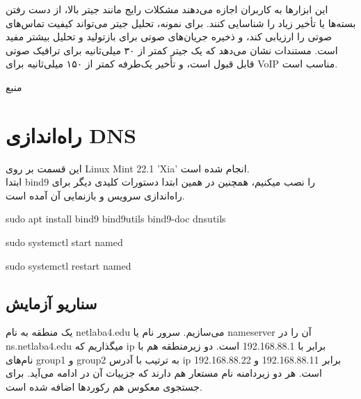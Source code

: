 \documentclass[12pt]{article}
\begin{document}
	 این ابزارها به کاربران اجازه می‌دهند مشکلات رایج مانند جیتر بالا، از دست رفتن بسته‌ها یا تأخیر زیاد را شناسایی کنند. برای نمونه، تحلیل جیتر می‌تواند کیفیت تماس‌های صوتی را ارزیابی کند، و ذخیره جریان‌های صوتی برای بازتولید و تحلیل بیشتر مفید است. مستندات نشان می‌دهد که یک جیتر کمتر از ۳۰ میلی‌ثانیه برای ترافیک صوتی قابل قبول است، و تأخیر یک‌طرفه کمتر از ۱۵۰ میلی‌ثانیه برای VoIP مناسب است.
	 
	 منبع \cite{a3}
	\section{راه‌اندازی \textenglish{DNS}}
	این قسمت بر روی \textenglish{Linux Mint 22.1 'Xia'} انجام شده است.\\
	ابتدا bind9 را نصب میکنیم، همچنین در همین ابتدا دستورات کلیدی دیگر برای راه‌اندازی سرویس و بازنمایی آن آمده است.
	
	\begin{english}
		sudo apt install bind9 bind9utils bind9-doc dnsutils
	\end{english}
	
	\begin{english}
		sudo systemctl start named
	\end{english}
	
	\begin{english}
		sudo systemctl restart named
	\end{english}
	
	\subsection{سناریو آزمایش}
	یک منطقه به نام netlaba4.edu می‌سازیم. سرور نام یا nameserver آن را در ns.netlaba4.edu میگذاریم که ip برابر با 192.168.88.1 است. دو زیرمنطقه هم با نام‌های group1 و group2 به ترتیب با آدرس ip برابر 192.168.88.11 و 192.168.88.22 است. هر دو زیردامنه نام مستعار هم دارند که جزییات آن در ادامه می‌آید. برای جستجوی معکوس هم رکورد‌ها اضافه شده است.
	
\end{document}
